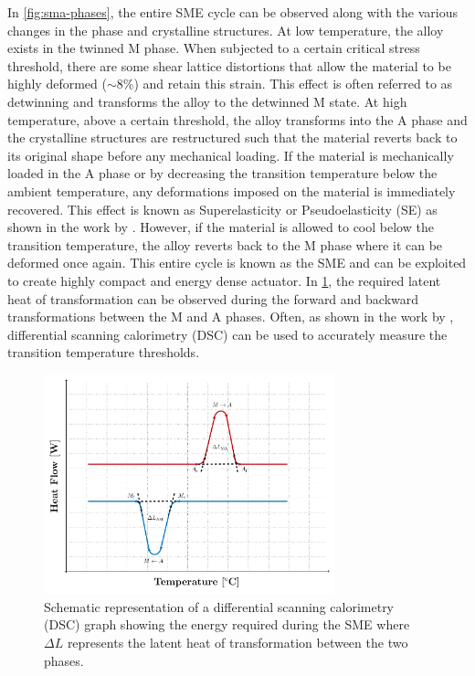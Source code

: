 In \cref{fig:sma-phases}, the entire SME cycle can be observed along with the various changes in the phase and crystalline structures. At low temperature, the alloy exists in the twinned M phase. When subjected to a certain critical stress threshold, there are some shear lattice distortions that allow the material to be highly deformed ($\sim8$\%) and retain this strain. This effect is often referred to as detwinning and transforms the alloy to the detwinned M state. At high temperature, above a certain threshold, the alloy transforms into the A phase and the crystalline structures are restructured such that the material reverts back to its original shape before any mechanical loading. If the material is mechanically loaded in the A phase or by decreasing the transition temperature below the ambient temperature, any deformations imposed on the material is immediately recovered. This effect is known as Superelasticity or Pseudoelasticity (SE) as shown in the work by \cite{otsukaPseudoelasticityShapeMemory1986}. However, if the material is allowed to cool below the transition temperature, the alloy reverts back to the M phase where it can be deformed once again. This entire cycle is known as the SME and can be exploited to create highly compact and energy dense actuator. In \cref{fig:dsc-graph}, the required latent heat of transformation can be observed during the forward and backward transformations between the M and A phases. Often, as shown in the work by \cite{heDSCAnalysisReverse2004}, differential scanning calorimetry (DSC) can be used to accurately measure the transition temperature thresholds.

\begin{figure}[hbt]
    \centering
    \includegraphics[width=0.75\textwidth]{images/chap2/dsc-graph.pdf}
    \caption{Schematic representation of a differential scanning calorimetry (DSC) graph showing the energy required during the SME where $\Delta L$ represents the latent heat of transformation between the two phases.}
    \label{fig:dsc-graph}
\end{figure}

